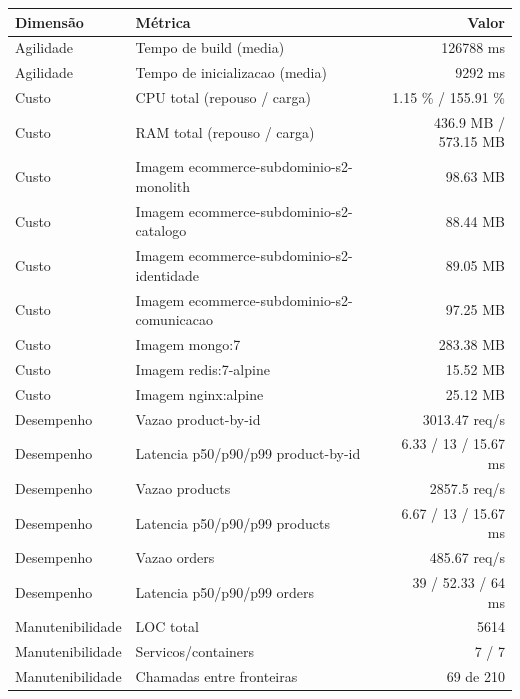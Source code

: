 \begin{quadro}[htb]
  \centering
  \caption{Métricas (ecommerce, subdominio, snapshot-2).}
  \label{qua:metricas-ecommerce-subdominio-snapshot-2}
  \renewcommand{\arraystretch}{1.15}
  \begin{tabular}{|l|l|r|}
    \hline
    \textbf{Dimensão} & \textbf{Métrica} & \textbf{Valor} \\
    \hline
    Agilidade & Tempo de build (media) & 126788 ms \\ \hline
    Agilidade & Tempo de inicializacao (media) & 9292 ms \\ \hline
    Custo & CPU total (repouso / carga) & 1.15 \% / 155.91 \% \\ \hline
    Custo & RAM total (repouso / carga) & 436.9 MB / 573.15 MB \\ \hline
    Custo & Imagem ecommerce-subdominio-s2-monolith & 98.63 MB \\ \hline
    Custo & Imagem ecommerce-subdominio-s2-catalogo & 88.44 MB \\ \hline
    Custo & Imagem ecommerce-subdominio-s2-identidade & 89.05 MB \\ \hline
    Custo & Imagem ecommerce-subdominio-s2-comunicacao & 97.25 MB \\ \hline
    Custo & Imagem mongo:7 & 283.38 MB \\ \hline
    Custo & Imagem redis:7-alpine & 15.52 MB \\ \hline
    Custo & Imagem nginx:alpine & 25.12 MB \\ \hline
    Desempenho & Vazao product-by-id & 3013.47 req/s \\ \hline
    Desempenho & Latencia p50/p90/p99 product-by-id & 6.33 / 13 / 15.67 ms \\ \hline
    Desempenho & Vazao products & 2857.5 req/s \\ \hline
    Desempenho & Latencia p50/p90/p99 products & 6.67 / 13 / 15.67 ms \\ \hline
    Desempenho & Vazao orders & 485.67 req/s \\ \hline
    Desempenho & Latencia p50/p90/p99 orders & 39 / 52.33 / 64 ms \\ \hline
    Manutenibilidade & LOC total & 5614 \\ \hline
    Manutenibilidade & Servicos/containers & 7 / 7 \\ \hline
    Manutenibilidade & Chamadas entre fronteiras & 69 de 210 \\ \hline
  \end{tabular}
\end{quadro}
